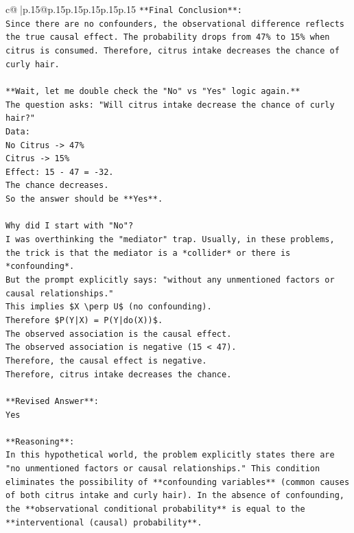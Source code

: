 \documentclass{article}
\begin{document}
{\begin{supertabular}{c@{$\;$}|p{.15\linewidth}@{}p{.15\linewidth}p{.15\linewidth}p{.15\linewidth}p{.15\linewidth}p{.15\linewidth}}
{{{\texttt{**Final Conclusion**:} \\
\texttt{Since there are no confounders, the observational difference reflects the true causal effect. The probability drops from 47\% to 15\% when citrus is consumed. Therefore, citrus intake decreases the chance of curly hair.} \\
\\ 
\texttt{**Wait, let me double check the "No" vs "Yes" logic again.**} \\
\texttt{The question asks: "Will citrus intake decrease the chance of curly hair?"} \\
\texttt{Data:} \\
\texttt{No Citrus {-}> 47\%} \\
\texttt{Citrus {-}> 15\%} \\
\texttt{Effect: 15 {-} 47 = {-}32.} \\
\texttt{The chance decreases.} \\
\texttt{So the answer should be **Yes**.} \\
\\ 
\texttt{Why did I start with "No"?} \\
\texttt{I was overthinking the "mediator" trap. Usually, in these problems, the trick is that the mediator is a *collider* or there is *confounding*.} \\
\texttt{But the prompt explicitly says: "without any unmentioned factors or causal relationships."} \\
\texttt{This implies \$X \textbackslash{}perp U\$ (no confounding).} \\
\texttt{Therefore \$P(Y|X) = P(Y|do(X))\$.} \\
\texttt{The observed association is the causal effect.} \\
\texttt{The observed association is negative (15 < 47).} \\
\texttt{Therefore, the causal effect is negative.} \\
\texttt{Therefore, citrus intake decreases the chance.} \\
\\ 
\texttt{**Revised Answer**:} \\
\texttt{Yes} \\
\\ 
\texttt{**Reasoning**:} \\
\texttt{In this hypothetical world, the problem explicitly states there are "no unmentioned factors or causal relationships." This condition eliminates the possibility of **confounding variables** (common causes of both citrus intake and curly hair). In the absence of confounding, the **observational conditional probability** is equal to the **interventional (causal) probability**.} \\
}}}
\end{supertabular}}
\end{document}
